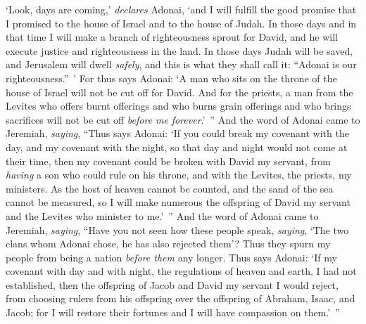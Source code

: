 \begin{biblechapter}
\verse ‘Look, days are coming,’ \textit{declares} Adonai, ‘and I will fulfill the good promise that I promised to the house of Israel and to the house of Judah.
\verse In those days and in that time I will make a branch of righteousness sprout for David, and he will execute justice and righteousness in the land.
\verse In those days Judah will be saved, and Jerusalem will dwell \textit{safely}, and this is what they shall call it: “Adonai is our righteousness.” ’
\verse For thus says Adonai: ‘A man who sits on the throne of the house of Israel will not be cut off for David.
\verse And for the priests, a man from the Levites who offers burnt offerings and who burns grain offerings and who brings sacrifices will not be cut off \textit{before me} \textit{forever}.’ ”
\verse And the word of Adonai came to Jeremiah, \textit{saying},
\verse “Thus says Adonai: ‘If you could break my covenant with the day, and my covenant with the night, so that day and night would not come at their time,
\verse then my covenant could be broken with David my servant, from \textit{having} a son who could rule on his throne, and with the Levites, the priests, my ministers.
\verse As the host of heaven cannot be counted, and the sand of the sea cannot be measured, so I will make numerous the offspring of David my servant and the Levites who minister to me.’ ”
\verse And the word of Adonai came to Jeremiah, \textit{saying},
\verse “Have you not seen how these people speak, \textit{saying}, ‘The two clans whom Adonai chose, he has also rejected them’? Thus they spurn my people from being a nation \textit{before them} any longer.
\verse Thus says Adonai: ‘If my covenant with day and with night, the regulations of heaven and earth, I had not established,
\verse then the offspring of Jacob and David my servant I would reject, from choosing rulers from his offspring over the offspring of Abraham, Isaac, and Jacob; for I will restore their fortunes and I will have compassion on them.’ ”
\end{biblechapter}

